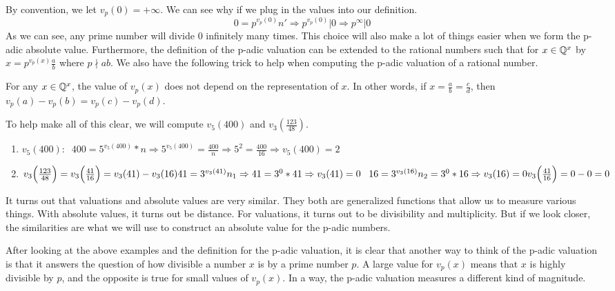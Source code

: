 \documentclass[a4paper]{article}
\begin{document}
By convention, we let \(v_p(0)=+\infty\).  We can see why if we 
plug in the values into our definition.
\[
	0=p^{v_p(0)}n'\Rightarrow p^{v_p(0)}\big|0\Rightarrow
    p^\infty|0
\]
As we can see, any prime number will divide 0 infinitely many 
times.  This choice will also make a lot of things easier when we 
form the p-adic absolute value.  Furthermore, the definition of the p-adic valuation can be 
extended to the rational numbers such that for \(x\in\mathbb Q^x\) by
\(x=p^{v_p(x)}\frac{a}{b}\) where \(p\nmid ab\).  We also have the following trick to help when computing the p-adic valuation of a rational number.

\begin{theorem}
  For any \(x\in\mathbb Q^x\), the value of \(v_p(x)\) does not depend
  on the representation of \(x\).  In other words, if 
  \(x=\frac{a}{b}=\frac{c}{d}\), then 
  \(v_p(a)-v_p(b)=v_p(c)-v_p(d)\).
\end{theorem}

  To help make all of this clear, we will 
  compute \(v_5(400)\) and \(v_3(\frac{123}{48})\).
\begin{enumerate}[label=\emph{\alph*})]
  \item \(v_5(400):\;\;400=5^{v_5(400)}*n\Rightarrow 
    5^{v_5(400)} = \frac{400}{n}\Rightarrow 5^2=\frac{400}{16}
    \Rightarrow v_5(400)=2\)
  \item \(v_3\Big(\frac{123}{48}\Big)=
    v_3\Big(\frac{41}{16}\Big)=v_3(41)-v_3(16)\\
    41=3^{v_3(41)}n_1\Rightarrow 41=3^{0}*41\Rightarrow
    v_3(41)=0\\
    \;\;\;16=3^{v_3(16)}n_2=3^0*16\Rightarrow v_3(16)=0\\
    v_3\Big(\frac{41}{16}\Big)=0-0=0\)
\end{enumerate}

It turns out that valuations and absolute values are very 
similar.  They both are generalized functions that allow
us to measure various things.  With absolute values, it 
turns out be distance.  For valuations, it turns out to be
divisibility and multiplicity.  But if we look closer, the similarities are what we will use to construct an absolute value for the p-adic numbers.

After looking at the above examples and the definition for the 
p-adic valuation, it is clear that another way to think of the 
p-adic valuation is that it answers the question of how divisible 
a number $x$ is by a prime number $p$.  A large value for \(v_p(x)\)
means that \(x\) is highly divisible by \(p\), and the opposite 
is true for small values of \(v_p(x)\).  In a way, the p-adic
valuation measures a different kind of magnitude.
\end{document}
